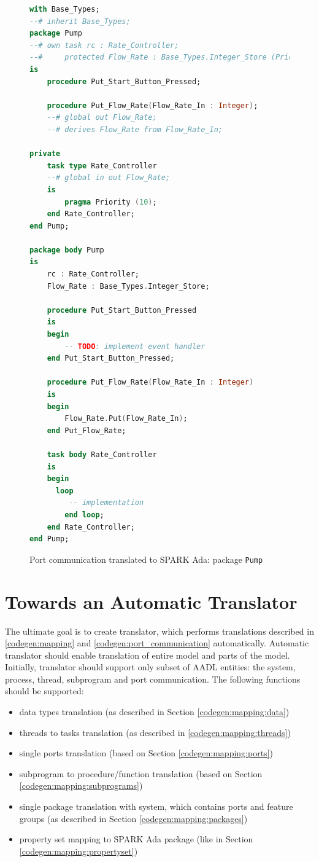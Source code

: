 \begin{figure}[ht]
\singlespacing
\begin{lstlisting}[language=ada, frame=single, gobble=0]
with Base_Types;
--# inherit Base_Types;
package Pump
--# own task rc : Rate_Controller;
--#     protected Flow_Rate : Base_Types.Integer_Store (Priority => 10);
is
    procedure Put_Start_Button_Pressed;

    procedure Put_Flow_Rate(Flow_Rate_In : Integer);
    --# global out Flow_Rate;
    --# derives Flow_Rate from Flow_Rate_In;

private
    task type Rate_Controller
    --# global in out Flow_Rate;
    is
        pragma Priority (10);
    end Rate_Controller;
end Pump;

package body Pump
is
    rc : Rate_Controller;
    Flow_Rate : Base_Types.Integer_Store;

    procedure Put_Start_Button_Pressed
    is
    begin
        -- TODO: implement event handler
    end Put_Start_Button_Pressed;

    procedure Put_Flow_Rate(Flow_Rate_In : Integer)
    is
    begin
        Flow_Rate.Put(Flow_Rate_In);
    end Put_Flow_Rate;

    task body Rate_Controller
    is
    begin
      loop
         -- implementation
        end loop;
    end Rate_Controller;
end Pump;
\end{lstlisting} 
\doublespacing
\caption{Port communication translated to SPARK Ada: package \lstinline{Pump}}
\label{listing:port_communication_spark_pump}
\end{figure}


\section{Towards an Automatic Translator}
\label{codegen:translator}

The ultimate goal is to create translator, which performs translations described in \ref{codegen:mapping} and \ref{codegen:port_communication} automatically. Automatic translator should enable translation of entire model and parts of the model. Initially, translator should support only subset of AADL entities: the system, process, thread, subprogram and port communication. The following functions should be supported:
\begin{itemize}
	\item data types translation (as described in Section \ref{codegen:mapping:data})
	\item threads to tasks translation (as described in \ref{codegen:mapping:threads})
	\item single ports translation (based on Section \ref{codegen:mapping:ports})
	\item subprogram to procedure/function translation (based on Section \ref{codegen:mapping:subprograms})
	\item single package translation with system, which contains ports and feature groups (as described in Section \ref{codegen:mapping:packages})
	\item property set mapping to SPARK Ada package (like in Section \ref{codegen:mapping:propertyset})
\end{itemize}

